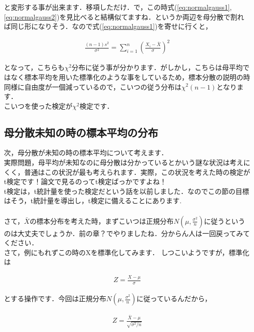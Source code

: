 \documentclass[11pt,a4paper]{ujreport} 	%
\begin{document}
と変形する事が出来ます．移項しただけ．で，この時式(\ref{eq:normalgauss1}, \ref{eq:normalgauss2})を見比べると結構似てますね．というか両辺を母分散で割れば同じ形になりそう．なので式(\ref{eq:normalgauss1})を寄せに行くと，

\begin{align}
  \frac{(n-1)s^2}{\sigma^2} =\sum_{i=1}^n (\frac{X_i-\bar{X}}{\sigma})^2
\end{align}

となって，こちらも$\chi^2$分布に従う事が分かります．がしかし，こちらは母平均ではなく標本平均を用いた標準化のような事をしているため，標本分散の説明の時同様に自由度が一個減っているので，こいつの従う分布は$\chi^2(n-1)$となります．\\

こいつを使った検定が$\chi^2$検定です．

\subsection{母分散未知の時の標本平均の分布}
次，母分散が未知の時の標本平均について考えます．\\

実際問題，母平均が未知なのに母分散は分かっているとかいう謎な状況は考えにくく，普通はこの状況が最も考えられます．実際，この状況を考えた時の検定がt検定です！論文で見るのってt検定ばっかですよね！\\

t検定は，t統計量を使った検定だという話を以前しました．なのでこの節の目標はそう，t統計量を導出し，t検定に備えることにあります.\\\\

さて，$\bar{X}$の標本分布を考えた時，まずこいつは正規分布$N(\mu, \frac{\sigma^2}{n})$に従うというのは大丈夫でしょうか．前の章？でやりましたね．分からん人は一回戻ってみてください．\\

さて，例にもれずこの時のXを標準化してみます．
しつこいようですが，標準化は

\begin{align}
  Z = \frac{X-\mu}{\sigma}
\end{align}

とする操作です．今回は正規分布$N(\mu, \frac{\sigma^2}{n})$に従っているんだから，

\begin{align}
  Z = \frac{\bar{X} - \mu}{\sqrt{\sigma^2/n}}
\end{align}
\end{document}
